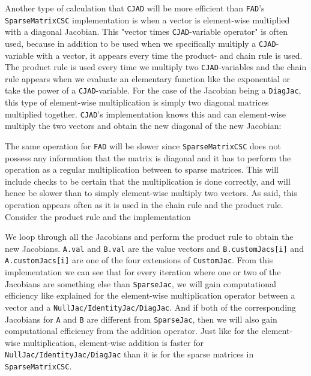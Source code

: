 Another type of calculation that \texttt{CJAD} will be more efficient than \texttt{FAD}'s \texttt{SparseMatrixCSC} implementation is when a vector is element-wise multiplied with a diagonal Jacobian. This "vector times \texttt{CJAD}-variable operator" is often used, because in addition to be used when we specifically multiply a \texttt{CJAD}-variable with a vector, it appears every time the product- and chain rule is used. The product rule is used every time we multiply two \texttt{CJAD}-variables and the chain rule appears when we evaluate an elementary function like the exponential or take the power of a \texttt{CJAD}-variable. For the case of the Jacobian being a \texttt{DiagJac}, this type of element-wise multiplication is simply two diagonal matrices multiplied together. \texttt{CJAD}'s implementation knows this and can element-wise multiply the two vectors and obtain the new diagonal of the new Jacobian:

The same operation for \texttt{FAD} will be slower since \texttt{SparseMatrixCSC} does not possess any information that the matrix is diagonal and it has to perform the operation as a regular multiplication between to sparse matrices. This will include checks to be certain that the multiplication is done correctly, and will hence be slower than to simply element-wise multiply two vectors. As said, this operation appears often as it is used in the chain rule and the product rule. Consider the product rule and the implementation

We loop through all the Jacobians and perform the product rule to obtain the new Jacobians. \texttt{A.val} and \texttt{B.val} are the value vectors and \texttt{B.customJacs[i]} and \texttt{A.customJacs[i]} are one of the four extensions of \texttt{CustomJac}. From this implementation we can see that for every iteration where one or two of the Jacobians are something else than \texttt{SparseJac}, we will gain computational efficiency like explained for the element-wise multiplication operator between a vector and a \texttt{NullJac/IdentityJac/DiagJac}. And if both of the corresponding Jacobians for \texttt{A} and \texttt{B} are different from \texttt{SparseJac}, then we will also gain computational efficiency from the addition operator. Just like for the element-wise multiplication, element-wise addition is faster for \texttt{NullJac/IdentityJac/DiagJac} than it is for the sparse matrices in \texttt{SparseMatrixCSC}.

